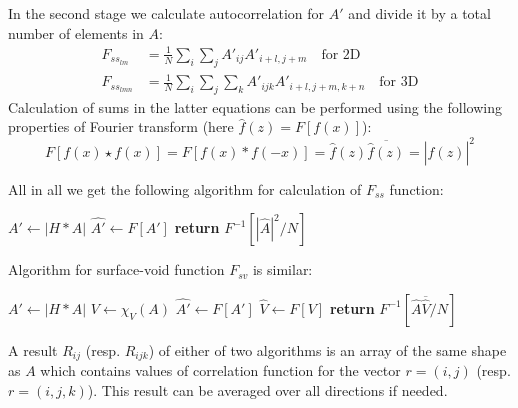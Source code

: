 \documentclass[reprint,amsmath,amssymb,aps,pre,showkeys,showpacs]{revtex4-1}
\begin{document}
In the second stage we calculate autocorrelation for $A'$ and divide it by a
total number of elements in $A$:
\begin{align*}
  F_{{ss}_{lm}} &= \frac{1}{N} \sum_i \sum_j A'_{ij}A'_{i+l, j+m} \quad
  \text{for 2D} \\
  F_{{ss}_{lmn}} &= \frac{1}{N} \sum_i \sum_j \sum_k A'_{ijk}A'_{i+l, j+m, k+n}
  \quad \text{for 3D}
\end{align*}
Calculation of sums in the latter equations can be performed using the following
properties of Fourier transform (here $\hat{f}(z) = F[f(x)]$):
\begin{equation*}
  F[f(x) \star f(x)] = F[f(x) * f(-x)] = \hat{f}(z)\overline{\hat{f}(z)} = |\hat{f}(z)|^2
\end{equation*}

All in all we get the following algorithm for calculation of $F_{ss}$ function:
\begin{algorithmic}[1]
  \State $A' \gets |H*A|$
  \State $\hat{A'} \gets F[A']$
  \State \textbf{return} $F^{-1}[ |\hat{A}|^2 / N]$
  \EndProcedure
\end{algorithmic}

Algorithm for surface-void function $F_{sv}$ is similar:
\begin{algorithmic}[1]
  \State $A' \gets |H*A|$
  \State $V \gets \chi_V(A)$
  \State $\hat{A'} \gets F[A']$
  \State $\hat{V} \gets F[V]$
  \State \textbf{return} $F^{-1}[ \hat{A}\overline{\hat{V}} / N]$
  \EndProcedure
\end{algorithmic}

A result $R_{ij}$ (resp. $R_{ijk}$) of either of two algorithms is an array of
the same shape as $A$ which contains values of correlation function for the
vector $r = (i, j)$ (resp. $r = (i, j, k)$). This result can be averaged over
all directions if needed.
\end{document}
